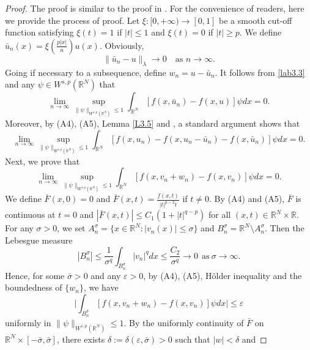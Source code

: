 \documentclass[reqno]{amsart}
\begin{document}
\begin{proof}
The proof is similar to the proof in \cite{r6}. 
For the convenience of readers, here we provide the process of proof. 
Let $\xi: [0, +\infty)\to [0,1]$ be a smooth cut-off function satisfying $\xi(t)=1$ 
if $|t|\leq1$ and $\xi(t)=0$ if $|t|\geq p$. 
We define $\bar{u}_n(x)=\xi(\frac{p|x|}{n})u(x)$. Obviously,
\begin{equation}\label{lab3.3}
\|\bar{u}_n-u\|_\lambda\to 0 \quad \text{as } n\to \infty.
\end{equation}
Going if necessary to a subsequence, define $w_n=u-\bar{u}_n$. 
It follows from \eqref{lab3.3} and any $\psi\in W^{s,p}(\mathbb{R}^N)$ that
\begin{equation}\label{lab3.4}
\lim_{n\to \infty}\sup_{\|\psi\|_{W^{s,p}(\mathbb{R}^N)}\leq1}
\int_{\mathbb{R}^N} [f(x,\bar{u}_n)-f(x,u)]\psi dx=0.
\end{equation}
Moreover, by (A4), (A5), Lemma \ref{L3.5} and \cite[Lemma 3.3]{r15}, a standard
argument shows that
\begin{equation}\label{lab3.5}
\lim_{n\to \infty}\sup_{\|\psi\|_{W^{s,p}(\mathbb{R}^N)}\leq1}
\int_{\mathbb{R}^N} [f(x,u_n)-f(x,u_n-\bar{u}_n)-f(x,\bar{u}_n)]\psi dx=0.
\end{equation}
Next, we prove that
\begin{equation}\label{lab3.6}
\lim_{n\to \infty}\sup_{\|\psi\|_{W^{s,p}(\mathbb{R}^N)}\leq1}
\int_{\mathbb{R}^N} [f(x,v_n+w_n)-f(x,v_n)]\psi dx=0.
\end{equation}
We define $\bar{F}(x,0)=0$ and
$\bar{F}(x,t)=\frac{f(x,t)}{|t|^{p-2}t}$ if $t\neq0.$
By (A4) and (A5), $\bar{F}$ is continuous at $t=0$ and
$|\bar{F}(x,t)|\leq C_1(1+|t|^{q-p})$ for all $(x,t)\in\mathbb{R}^N\times\mathbb{R}$. 
For any $\sigma>0$, we set $A^\sigma_n=\{x\in \mathbb{R}^N: |v_n(x)|\leq \sigma \}$ 
and $B^\sigma_n=\mathbb{R}^N\setminus A^\sigma_n$. Then the Lebesgue measure
$$
|B^\sigma_n|\leq\frac{1}{\sigma^q}\int_{B^\sigma_n}|v_n|^qdx
\leq\frac{C_2}{\sigma^q}\to 0\ \ \text{as}\ \sigma\to \infty.
$$
Hence, for some $\bar{\sigma}>0$ and any $\varepsilon>0$, by (A4), (A5),
H\"older inequality and the boundedness of $\{w_n\}$, we have
\begin{equation}\label{lab3.7}
\Big|\int_{B^{\bar{\sigma}}_n} [f(x,v_n+w_n)-f(x,v_n)]\psi dx\Big|\leq\varepsilon
\end{equation}
uniformly in $\|\psi\|_{W^{s,p}(\mathbb{R}^N)}\leq1$. 
By the uniformly continuity of $\bar{F}$ on 
$\mathbb{R}^N\times[-\bar{\sigma}, \bar{\sigma}]$, there exists 
$\delta:=\delta(\varepsilon, \bar{\sigma})>0$ such that $|w|<\delta$ and

\end{proof}
\end{document}
